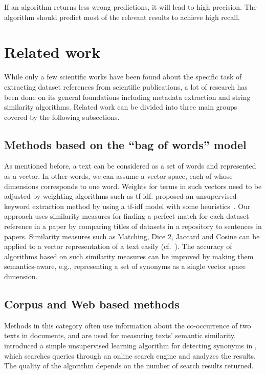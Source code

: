 \documentclass{IOS-Book-Article}
\begin{document}
If an algorithm returns less wrong predictions, it will lead to high precision. The algorithm should predict most of the relevant results to achieve high recall.

\section{Related work}
\label{sec:relWork}
While only a few scientific works have been found about the specific task of extracting dataset references from scientific publications, a lot of research has been done on its general foundations including metadata extraction and string similarity algorithms. 
Related work can be divided into three main groups covered by the following subsections.
\subsection{Methods based on the “bag of words” model}
As mentioned before, a text can be considered as a set of words and represented as a vector.
In other words, we can assume a vector space, each of whose dimensions corresponds to one word.
Weights for terms in such vectors need to be adjusted by weighting algorithms such as tf-idf.
\citeauthor{Lee2008} proposed an unsupervised keyword extraction method by using a tf-idf model with some heuristics~\citeyearpar{Lee2008}.
Our approach uses similarity measures for finding a perfect match for each dataset reference in a paper by comparing titles of datasets in a repository to sentences in papers.
Similarity measures such as Matching, Dice 2, Jaccard and Cosine can be applied to a vector representation of a text easily (cf.~\citet{ChristopherD1999}).
The accuracy of algorithms based on such similarity measures can be improved by making them semantics-aware, e.g., representing a set of synonyms as a single vector space dimension.

\subsection{Corpus and Web based methods}
Methods in this category often use information about the co-occurrence of two texts in documents, and are used for measuring texts' semantic similarity.
\citeauthor{Turney2001} introduced a simple unsupervised learning algorithm for detecting synonyms in \citeyear{Turney2001}, which searches queries through an online search engine and analyzes the results. The quality of the algorithm depends on the number of search results returned.  
\end{document}
